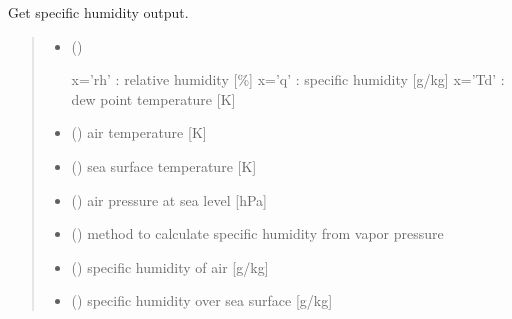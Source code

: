 \documentclass[letterpaper,10pt,english]{sphinxmanual}
\begin{document}
\begin{fulllineitems}
\label{\detokenize{users_guide:AirSeaFluxCode.hum_subs.get_hum}}
\pysigstartsignatures
{}
\pysigstopsignatures
\sphinxAtStartPar
Get specific humidity output.
\begin{quote}\begin{description}
\begin{itemize}
\item {} 
\sphinxAtStartPar
{} () \textendash{} \begin{description}
\sphinxAtStartPar
x=’rh’ : relative humidity {[}\%{]}
x=’q’ : specific humidity {[}g/kg{]}
x=’Td’ : dew point temperature {[}K{]}

\end{description}


\item {} 
\sphinxAtStartPar
{} () \textendash{} air temperature {[}K{]}

\item {} 
\sphinxAtStartPar
{} () \textendash{} sea surface temperature {[}K{]}

\item {} 
\sphinxAtStartPar
{} () \textendash{} air pressure at sea level {[}hPa{]}

\item {} 
\sphinxAtStartPar
{} () \textendash{} method to calculate specific humidity from vapor pressure

\end{itemize}

\sphinxAtStartPar
\begin{itemize}
\item {} 
\sphinxAtStartPar
{} () \textendash{} specific humidity of air {[}g/kg{]}

\item {} 
\sphinxAtStartPar
{} () \textendash{} specific humidity over sea surface {[}g/kg{]}

\end{itemize}


\end{description}\end{quote}

\end{fulllineitems}
\end{document}
